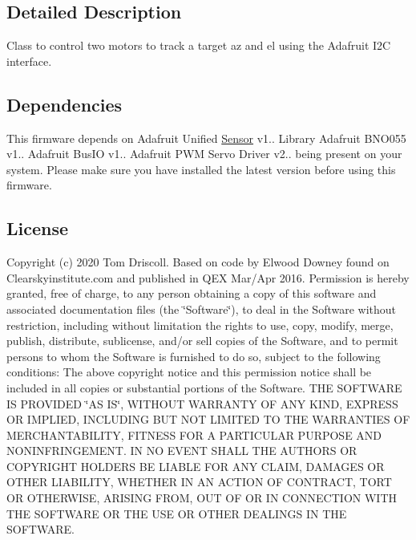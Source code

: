 \subsection{Detailed Description}
Class to control two motors to track a target az and el using the Adafruit I2C interface. 

\hypertarget{main_8cpp_dependencies}{}\subsection{Dependencies}\label{main_8cpp_dependencies}
This firmware depends on Adafruit Unified \hyperlink{class_sensor}{Sensor} v1.. Library Adafruit B\+N\+O055 v1.. Adafruit Bus\+IO v1.. Adafruit P\+WM Servo Driver v2.. being present on your system. Please make sure you have installed the latest version before using this firmware.\hypertarget{main_8cpp_license}{}\subsection{License}\label{main_8cpp_license}
Copyright (c) 2020 Tom Driscoll. Based on code by Elwood Downey found on Clearskyinstitute.\+com and published in Q\+EX Mar/\+Apr 2016. Permission is hereby granted, free of charge, to any person obtaining a copy of this software and associated documentation files (the \char`\"{}\+Software\char`\"{}), to deal in the Software without restriction, including without limitation the rights to use, copy, modify, merge, publish, distribute, sublicense, and/or sell copies of the Software, and to permit persons to whom the Software is furnished to do so, subject to the following conditions\+: The above copyright notice and this permission notice shall be included in all copies or substantial portions of the Software. T\+HE S\+O\+F\+T\+W\+A\+RE IS P\+R\+O\+V\+I\+D\+ED \char`\"{}\+A\+S I\+S\char`\"{}, W\+I\+T\+H\+O\+UT W\+A\+R\+R\+A\+N\+TY OF A\+NY K\+I\+ND, E\+X\+P\+R\+E\+SS OR I\+M\+P\+L\+I\+ED, I\+N\+C\+L\+U\+D\+I\+NG B\+UT N\+OT L\+I\+M\+I\+T\+ED TO T\+HE W\+A\+R\+R\+A\+N\+T\+I\+ES OF M\+E\+R\+C\+H\+A\+N\+T\+A\+B\+I\+L\+I\+TY, F\+I\+T\+N\+E\+SS F\+OR A P\+A\+R\+T\+I\+C\+U\+L\+AR P\+U\+R\+P\+O\+SE A\+ND N\+O\+N\+I\+N\+F\+R\+I\+N\+G\+E\+M\+E\+NT. IN NO E\+V\+E\+NT S\+H\+A\+LL T\+HE A\+U\+T\+H\+O\+RS OR C\+O\+P\+Y\+R\+I\+G\+HT H\+O\+L\+D\+E\+RS BE L\+I\+A\+B\+LE F\+OR A\+NY C\+L\+A\+IM, D\+A\+M\+A\+G\+ES OR O\+T\+H\+ER L\+I\+A\+B\+I\+L\+I\+TY, W\+H\+E\+T\+H\+ER IN AN A\+C\+T\+I\+ON OF C\+O\+N\+T\+R\+A\+CT, T\+O\+RT OR O\+T\+H\+E\+R\+W\+I\+SE, A\+R\+I\+S\+I\+NG F\+R\+OM, O\+UT OF OR IN C\+O\+N\+N\+E\+C\+T\+I\+ON W\+I\+TH T\+HE S\+O\+F\+T\+W\+A\+RE OR T\+HE U\+SE OR O\+T\+H\+ER D\+E\+A\+L\+I\+N\+GS IN T\+HE S\+O\+F\+T\+W\+A\+RE. 

